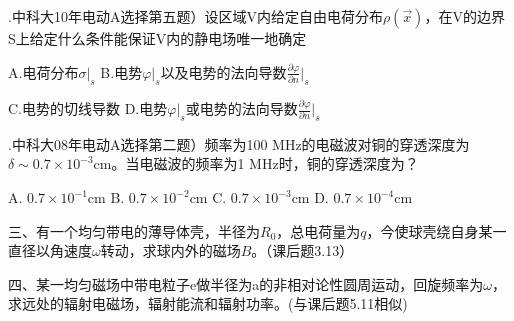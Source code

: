 .\hspace{0.8em}中科大10年电动A选择第五题）设区域V内给定自由电荷分布$\rho(\Vec{x})$，在V的边界S上给定什么条件能保证V内的静电场唯一地确定
\vspace{0.2cm}

A.\hspace{0.8em}电荷分布$\sigma|_s$ \hspace{5em}
B.\hspace{0.8em}电势$\varphi|_s$以及电势的法向导数$\displaystyle{ \frac{\partial \varphi}{\partial n}}|_s$\vspace{0.1cm}

C.\hspace{0.8em}电势的切线导数\hspace{4.2em}
D.\hspace{0.8em}电势$\varphi|_s$或电势的法向导数$\displaystyle{ \frac{\partial \varphi}{\partial n}}|_s$ \vspace{0.2cm}

.\hspace{0.8em}中科大08年电动A选择第二题）频率为100 MHz的电磁波对铜的穿透深度为$\delta \sim 0.7 \times 10^{-3}$cm。当电磁波的频率为1 MHz时，铜的穿透深度为？
\vspace{0.2cm}

A.\hspace{0.8em} $0.7 \times 10^{-1} $cm \hspace{2em}
B.\hspace{0.8em} $0.7 \times 10^{-2} $cm \hspace{2em}
C.\hspace{0.8em} $0.7 \times 10^{-3} $cm \hspace{2em}
D.\hspace{0.8em} $0.7 \times 10^{-4} $cm 

\vspace{0.4cm}

\noindent
三、\hspace{0.2em}有一个均匀带电的薄导体壳，半径为$R_0$，总电荷量为$q$，今使球壳绕自身某一直径以角速度$\omega$转动，求球内外的磁场$B$。（课后题3.13）\vspace{1cm}

\noindent
四、\hspace{0.2em}某一均匀磁场中带电粒子e做半径为a的非相对论性圆周运动，回旋频率为$\omega$，求远处的辐射电磁场，辐射能流和辐射功率。(与课后题5.11相似)
